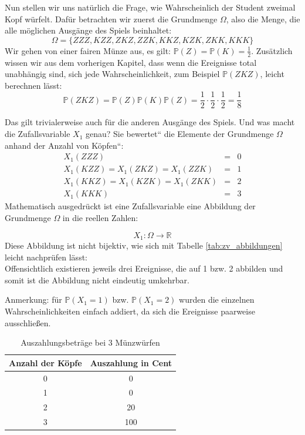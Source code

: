 {\begin{bsp}
    Nun stellen wir uns natürlich die Frage, wie Wahrscheinlich der Student
    zweimal Kopf würfelt. Dafür betrachten wir zuerst die Grundmenge $\Omega$, also die Menge, die alle
    möglichen Ausgänge des Spiels beinhaltet:
    \[\Omega=\{ZZZ,KZZ,ZKZ,ZZK,KKZ,KZK,ZKK,KKK\}\]
    Wir gehen von einer fairen Münze aus, es gilt: $\mathbb P\left(Z\right)=\mathbb P\left(K\right)=\frac{1}{2}$.
    Zusätzlich wissen wir aus dem vorherigen Kapitel, dass wenn die
    Ereignisse total unabhängig sind, sich jede Wahrscheinlichkeit, zum Beispiel $\mathbb P\left(ZKZ\right)$,
    leicht berechnen lässt:
    \[\mathbb P\left(ZKZ\right)=\mathbb P(Z)\mathbb P\left(K\right)\mathbb P\left(Z\right)=\frac{1}{2}\cdot\frac{1}{2}\cdot\frac{1}{2}=\frac{1}{8}\]

    Das gilt trivialerweise auch für die anderen Ausgänge des Spiels. Und was macht die 
    Zufallsvariable $X_{1}$ genau? Sie {\quotedblbase}bewertet{\textquotedblleft} die 
    Elemente der Grundmenge $\Omega $ anhand der Anzahl von {\quotedblbase}Köpfen{\textquotedblleft}:
    \begin{eqnarray*}
        X_{1}\left(ZZZ\right)&=&0\\
        X_{1}\left(KZZ\right)=X_{1}\left(ZKZ\right)=X_{1}\left(ZZK\right)&=&1\\
        X_{1}\left(KKZ\right)=X_{1}\left(KZK\right)=X_{1}\left(ZKK\right)&=&2\\
        X_{1}\left(KKK\right)&=&3
    \end{eqnarray*}
    Mathematisch ausgedrückt ist eine Zufallsvariable eine Abbildung der Grundmenge $\Omega$ 
    in die reellen Zahlen:

    \[
    X_{1}:\Omega \rightarrow \mathbb R
    \]
    Diese Abbildung ist nicht bijektiv, wie sich mit Tabelle \ref{tab:zv_abbildungen} leicht nachprüfen lässt:\\

    Offensichtlich existieren jeweils drei Ereignisse, die auf 1 bzw. 2
    abbilden und somit ist die Abbildung nicht eindeutig umkehrbar.
    

    Anmerkung: für  $\mathbb P\left(X_{1}=1\right)$ bzw. $\mathbb P\left(X_{1}=2\right)$
    wurden die einzelnen Wahrscheinlichkeiten einfach addiert, da sich die Ereignisse paarweise
    ausschließen.
    \end{bsp}

    \begin{table}
        \centering
        \begin{tabular}{cc}
        \hline
        \textbf{Anzahl der Köpfe} & \textbf{Auszahlung in Cent}\\
        \hline
         0 & 0\\
         1 & 0\\
         2 & 20\\
         3 & 100\\
         \hline
        \end{tabular}
        \caption{Auszahlungsbeträge bei 3 Münzwürfen}\label{tab:auszahlungen}
    \end{table}

}
